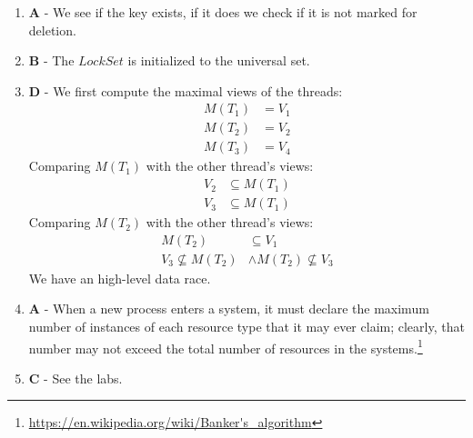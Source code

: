 \documentclass[a4paper,twocolumn]{article}
\begin{document}
\begin{enumerate}
    \item \textbf{A} - We see if the key exists, if it does we check if it is not marked for deletion.
    \item \textbf{B} - The $LockSet$ is initialized to the universal set.
    \item \textbf{D} - We first compute the maximal views of the threads:
    \begin{equation*}
        \begin{split}
            M(T_1) & = V_1 \\
            M(T_2) & = V_2 \\
            M(T_3) & = V_4
        \end{split}
    \end{equation*}
    Comparing $M(T_1)$ with the other thread's views:
    \begin{equation*}
        \begin{split}
            V_2 & \subseteq M(T_1) \\
            V_3 & \subseteq M(T_1)
        \end{split}
    \end{equation*}
    Comparing $M(T_2)$ with the other thread's views:
    \begin{equation*}
        \begin{split}
            M(T_2) & \subseteq V_1 \\
            V_3 \nsubseteq M(T_2) & \wedge M(T_2) \nsubseteq V_3
        \end{split}
    \end{equation*}
    We have an high-level data race.
    \item \textbf{A} - When a new process enters a system, it must declare the maximum number of instances of each resource type that it may ever claim;
    clearly, that number may not exceed the total number of resources in the systems.\footnote{\url{https://en.wikipedia.org/wiki/Banker's_algorithm}}
    \item \textbf{C} - See the labs.
\end{enumerate}
\end{document}
